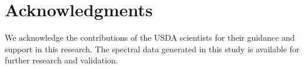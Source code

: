 \section{Acknowledgments}

We acknowledge the contributions of the USDA scientists for their guidance and support in this research. The spectral data generated in this study is available for further research and validation.